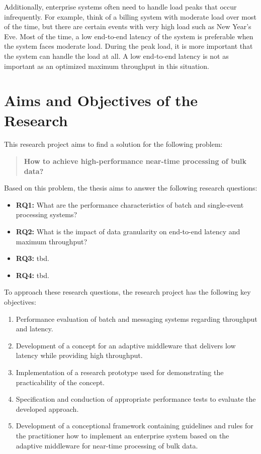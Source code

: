Additionally, enterprise systems often need to handle load peaks that occur infrequently. For example, think of a billing system with moderate load over most of the time, but there are certain events with very high load such as New Year's Eve. Most of the time, a low end-to-end latency of the system is preferable when the system faces moderate load. During the peak load, it is more important that the system can handle the load at all. A low end-to-end latency is not as important as an optimized maximum throughput in this situation.

\section{Aims and Objectives of the Research}\label{sec:research_objectives}
This research project aims to find a solution for the following problem:
\begin{quote}
\textbf{How to achieve high-performance near-time processing of bulk data?}
\end{quote}

Based on this problem, the thesis aims to answer the following research questions:
\begin{itemize}
	\item \textbf{RQ1:} What are the performance characteristics of batch and single-event processing systems?
	\item \textbf{RQ2:} What is the impact of data granularity on end-to-end latency and maximum throughput?
	\item \textbf{RQ3:} tbd.
	\item \textbf{RQ4:} tbd.
\end{itemize}

To approach these research questions, the research project has the following key objectives:
\begin{enumerate}
	\item Performance evaluation of batch and messaging systems regarding throughput and latency.
	\item Development of a concept for an adaptive middleware that delivers low latency while providing high throughput.
	\item Implementation of a research prototype used for demonstrating the practicability of the concept.
	\item Specification and conduction of appropriate performance tests to evaluate the developed approach.
	\item Development of a conceptional framework containing guidelines and rules for the practitioner how to implement an enterprise system based on the adaptive middleware for near-time processing of bulk data.
\end{enumerate}

